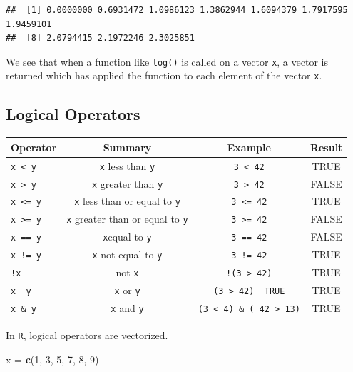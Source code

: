 \documentclass[]{book}
\newenvironment{Shaded}{\begin{snugshade}}{\end{snugshade}}
\newcommand{\KeywordTok}[1]{\textcolor[rgb]{0.13,0.29,0.53}{\textbf{#1}}}
\newcommand{\DecValTok}[1]{\textcolor[rgb]{0.00,0.00,0.81}{#1}}
\newcommand{\StringTok}[1]{\textcolor[rgb]{0.31,0.60,0.02}{#1}}
\newcommand{\NormalTok}[1]{#1}
\theoremstyle{definition}
\theoremstyle{definition}
\theoremstyle{definition}
\theoremstyle{remark}
\begin{document}
\begin{verbatim}
##  [1] 0.0000000 0.6931472 1.0986123 1.3862944 1.6094379 1.7917595 1.9459101
##  [8] 2.0794415 2.1972246 2.3025851
\end{verbatim}

We see that when a function like \texttt{log()} is called on a vector
\texttt{x}, a vector is returned which has applied the function to each
element of the vector \texttt{x}.

\subsection{Logical Operators}\label{logical-operators}

\begin{longtable}[]{@{}lccc@{}}
\toprule
Operator & Summary & Example & Result\tabularnewline
\midrule
\endhead
\texttt{x\ \textless{}\ y} & \texttt{x} less than \texttt{y} &
\texttt{3\ \textless{}\ 42} & TRUE\tabularnewline
\texttt{x\ \textgreater{}\ y} & \texttt{x} greater than \texttt{y} &
\texttt{3\ \textgreater{}\ 42} & FALSE\tabularnewline
\texttt{x\ \textless{}=\ y} & \texttt{x} less than or equal to
\texttt{y} & \texttt{3\ \textless{}=\ 42} & TRUE\tabularnewline
\texttt{x\ \textgreater{}=\ y} & \texttt{x} greater than or equal to
\texttt{y} & \texttt{3\ \textgreater{}=\ 42} & FALSE\tabularnewline
\texttt{x\ ==\ y} & \texttt{x}equal to \texttt{y} & \texttt{3\ ==\ 42} &
FALSE\tabularnewline
\texttt{x\ !=\ y} & \texttt{x} not equal to \texttt{y} &
\texttt{3\ !=\ 42} & TRUE\tabularnewline
\texttt{!x} & not \texttt{x} & \texttt{!(3\ \textgreater{}\ 42)} &
TRUE\tabularnewline
\texttt{x\ \textbar{}\ y} & \texttt{x} or \texttt{y} &
\texttt{(3\ \textgreater{}\ 42)\ \textbar{}\ TRUE} & TRUE\tabularnewline
\texttt{x\ \&\ y} & \texttt{x} and \texttt{y} &
\texttt{(3\ \textless{}\ 4)\ \&\ (\ 42\ \textgreater{}\ 13)} &
TRUE\tabularnewline
\bottomrule
\end{longtable}

In \texttt{R}, logical operators are vectorized.

\begin{Shaded}
\begin{Highlighting}[]
\NormalTok{x =}\StringTok{ }\KeywordTok{c}\NormalTok{(}\DecValTok{1}\NormalTok{, }\DecValTok{3}\NormalTok{, }\DecValTok{5}\NormalTok{, }\DecValTok{7}\NormalTok{, }\DecValTok{8}\NormalTok{, }\DecValTok{9}\NormalTok{)}
\end{Highlighting}
\end{Shaded}
\end{document}
